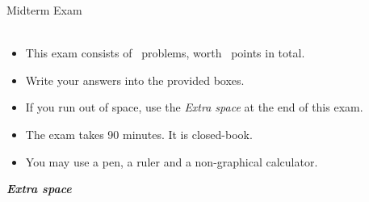 

\newcommand{\examtitle}{Midterm Exam}

\ifprintanswers\else\newcommand{\exambreak}{\newpage}\fi

\newcommand\boxheight[1]{\stretch{#1}}

\runningheader{\coursename}{}{\thepage}
\runningfooter{}{}{}



\vspace{5mm}

\vspace{5mm}

\vfill

\begin{center}
  {\Large \examtitle}\\ \bigskip
  {\large \coursename}\\ \bigskip
  {\large \term}

  \vfill

  \begin{itemize}
    \item This exam consists of \numquestions\ problems, worth \numpoints\ points in total.
    \item Write your answers into the provided boxes.
    \item If you run out of space, use the \emph{Extra space} at the end of this exam.
    \item The exam takes 90 minutes. It is closed-book.
    \item You may use a pen, a ruler and a non-graphical calculator.
  \end{itemize}
\end{center}

\vfill

\begin{center}
  \gradetable[v][questions]
\end{center}

\clearpage

\begin{questions}

\clearpage

\clearpage

\textbf{\emph{Extra space}}

\begin{solutionorbox}[\boxheight{1}]
\end{solutionorbox}

\end{questions}


